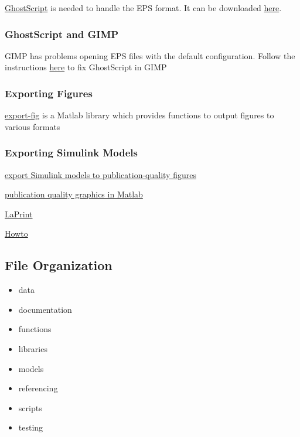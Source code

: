 \documentclass[]{article}
\providecommand{\tightlist}{%
  \setlength{\itemsep}{0pt}\setlength{\parskip}{0pt}}
\begin{document}
\href{http://www.ghostscript.com/}{GhostScript} is needed to handle the
EPS format. It can be downloaded
\href{http://www.ghostscript.com/download/}{here}.

\subsubsection{GhostScript and GIMP}\label{ghostscript-and-gimp}

GIMP has problems opening EPS files with the default configuration.
Follow the instructions
\href{http://blog.tjitjing.com/index.php/2013/05/solution-error-open-eps-in-gimp-64-bit-with-ghostscript.html}{here}
to fix GhostScript in GIMP

\subsubsection{Exporting Figures}\label{exporting-figures}

\href{http://www.mathworks.com/matlabcentral/fileexchange/23629-export-fig}{export-fig}
is a Matlab library which provides functions to output figures to
various formats

\subsubsection{Exporting Simulink
Models}\label{exporting-simulink-models}

\href{https://truongnghiem.wordpress.com/2010/07/07/export-simulink-models-to-publication-quality-figures/}{export
Simulink models to publication-quality figures}

\href{https://truongnghiem.wordpress.com/2010/05/28/more-on-publication-quality-graphics-in-matlab/}{publication
quality graphics in Matlab}

\href{http://www.mathworks.com/matlabcentral/fileexchange/4638-laprint}{LaPrint}

\href{http://www.mathworks.com/matlabcentral/answers/94951-how-do-i-save-my-simulink-model-as-a-tiff-or-jpeg-image}{Howto}

\subsection{File Organization}\label{file-organization}

\begin{itemize}
\tightlist
\item
  data
\item
  documentation
\item
  functions
\item
  libraries
\item
  models
\item
  referencing
\item
  scripts
\item
  testing
\end{itemize}
\end{document}
